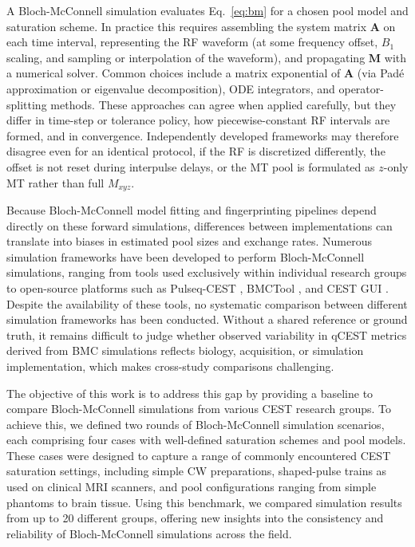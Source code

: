 \documentclass[11pt,a4paper]{article}
\begin{document}
A Bloch-McConnell simulation evaluates Eq.~\ref{eq:bm} for a chosen pool model and saturation scheme. In practice this requires assembling the system matrix $\mathbf{A}$ on each time interval, representing the RF waveform (at some frequency offset, $B_1$ scaling, and sampling or interpolation of the waveform), and propagating $\mathbf{M}$ with a numerical solver. Common choices include a matrix exponential of $\mathbf{A}$ (via Pad\'e approximation or eigenvalue decomposition), ODE integrators, and operator-splitting methods. These approaches can agree when applied carefully, but they differ in time-step or tolerance policy, how piecewise-constant RF intervals are formed, and in convergence. Independently developed frameworks may therefore disagree even for an identical protocol, if the RF is discretized differently, the offset is not reset during interpulse delays, or the MT pool is formulated as $z$-only MT rather than full $M_{xyz}$.

Because Bloch-McConnell model fitting and fingerprinting pipelines depend directly on these forward simulations, differences between implementations can translate into biases in estimated pool sizes and exchange rates.
Numerous simulation frameworks have been developed to perform Bloch-McConnell simulations, ranging from tools used exclusively within individual research groups to open-source platforms such as Pulseq-CEST \cite{Herz2021}, BMCTool \cite{SchuenkeBMC}, and CEST GUI \cite{Zhang2025}.
Despite the availability of these tools, no systematic comparison between different simulation frameworks has been conducted. Without a shared reference or ground truth, it remains difficult to judge whether observed variability in qCEST metrics derived from BMC simulations reflects biology, acquisition, or simulation implementation, which makes cross-study comparisons challenging.

The objective of this work is to address this gap by providing a baseline to compare Bloch-McConnell simulations from various CEST research groups. To achieve this, we defined two rounds of Bloch-McConnell simulation scenarios, each comprising four cases with well-defined saturation schemes and pool models. These cases were designed to capture a range of commonly encountered CEST saturation settings, including simple CW preparations, shaped-pulse trains as used on clinical MRI scanners, and pool configurations ranging from simple phantoms to brain tissue. Using this benchmark, we compared simulation results from up to 20 different groups, offering new insights into the consistency and reliability of Bloch-McConnell simulations across the field.
\end{document}
